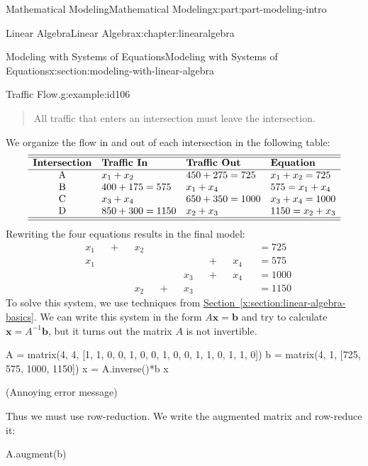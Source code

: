 \documentclass[oneside,10pt,]{book}
\newcommand{\xreffont}{\relax}
\numberwithin{equation}{section}
\begin{document}
\begin{partptx}{Mathematical Modeling}{}{Mathematical Modeling}{}{}{x:part:part-modeling-intro}
\begin{chapterptx}{Linear Algebra}{}{Linear Algebra}{}{}{x:chapter:linearalgebra}
\begin{sectionptx}{Modeling with Systems of Equations}{}{Modeling with Systems of Equations}{}{}{x:section:modeling-with-linear-algebra}
\begin{example}{Traffic Flow.}{g:example:id106}
\begin{quote}%
All traffic that enters an intersection must leave the intersection.\end{quote}
We organize the flow in and out of each intersection in the following table:%
%
\begin{equation*}
\begin{array}{clll}\hline\hline
\textbf{Intersection} & \textbf{Traffic In} & \textbf{Traffic Out} & \textbf{Equation} \\\hline
\textrm{A} &  x_1 + x_2 & 450 + 275 = 725 & x_1 + x_2 = 725 \\
\textrm{B} &  400 + 175 = 575 & x_1 + x_4 & 575 = x_1 + x_4 \\
\textrm{C} & x_3 + x_4 & 650 + 350 = 1000 & x_3 + x_4 = 1000 \\
\textrm{D} & 850 + 300 = 1150 & x_2 + x_3 & 1150 = x_2 + x_3 \\\hline\hline
\end{array}
\end{equation*}
Rewriting the four equations results in the final model:%
%
\begin{equation*}
\begin{aligned}
& x_1 && + && x_2 && && && && &&= 725 \\
& x_1 && && && &&  && + && x_4 &&= 575 \\
& && && && && x_3 && + && x_4 && = 1000 \\
& && && x_2 && + && x_3  && && &&= 1150
\end{aligned}
\end{equation*}
To solve this system, we use techniques from \hyperref[x:section:linear-algebra-basics]{Section~{\xreffont\ref{x:section:linear-algebra-basics}}}. We can write this system in the form \(A\mathbf{x} = \mathbf{b}\) and try to calculate \(\mathbf{x} = A^{-1}\mathbf{b}\), but it turns out the matrix \(A\) is not invertible.%
\begin{sageinput}
A = matrix(4, 4, [1, 1, 0, 0, 1, 0, 0, 1, 0, 0, 1, 1, 0, 1, 1, 0])
b = matrix(4, 1, [725, 575, 1000, 1150])
x = A.inverse()*b
x
\end{sageinput}
\begin{sageoutput}
(Annoying error message)
\end{sageoutput}
Thus we must use row-reduction. We write the augmented matrix and row-reduce it:%
\begin{sageinput}
A.augment(b)
\end{sageinput}
\begin{sageoutput}
[   1    1    0    0  725]

\end{sageoutput}
\end{example}
\end{sectionptx}
\end{chapterptx}
\end{partptx}
\end{document}
